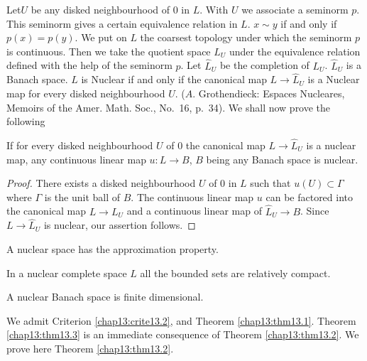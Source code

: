 \begin{crite}\label{chap13:crite13.2}
Let\pageoriginale $U$ be any disked neighbourhood of $0$ in $L$. With $U$ we
associate a seminorm $p$. This seminorm gives a certain equivalence
relation in $L$. $x \sim y$ if and only if $p(x) = p(y)$. We put on
$L$ the coarsest topology under which the seminorm $p$ is
continuous. Then we take the quotient space $L_U$ under the
equivalence relation defined with the help of the seminorm $p$. Let
$\hat{L}_U$ be the completion of $L_U$. $\hat{L}_U$ is a Banach
space. $L$ is Nuclear if and only if the canonical map $L \to
\hat{L}_U$ is a Nuclear map for every disked neighbourhood $U.$ ($A$.
Grothendieck: Espaces Nucleares, Memoirs of the Amer. Math. Soc.,
No.~16, p.~34). We shall now prove the following
\end{crite}

\begin{prop}\label{chap13:prop13.3}
If for every disked neighbourhood $U$ of $0$ the canonical map $L \to
\hat{L}_U$ is a nuclear map, any continuous linear map $u : L \to B$,
$B$ being any Banach space is nuclear.
\end{prop}

\begin{proof}
There exists a disked neighbourhood $U$ of $0$ in $L$ such that\break
$u(U)\subset \Gamma$ where $\Gamma$ is the unit ball of $B$. The
continuous linear map $u$ can be factored into the canonical map $L
\to L_U$ and a continuous linear map of $\hat{L}_U \to B$. Since $L
\to \hat{L}_U$ is nuclear, our assertion follows.
\end{proof}

\setcounter{section}{13}
\setcounter{theorem}{0}
\begin{theorem}\label{chap13:thm13.1}
A nuclear space has the approximation property.
\end{theorem}

\begin{theorem}\label{chap13:thm13.2}
In a nuclear complete space $L$ all the bounded sets are relatively compact.
\end{theorem}

\begin{theorem}\label{chap13:thm13.3}
A nuclear Banach space is finite dimensional. 
\end{theorem}
\noindent We admit Criterion \ref{chap13:crite13.2}, and Theorem
\ref{chap13:thm13.1}. Theorem \ref{chap13:thm13.3} is an
immediate consequence of Theorem \ref{chap13:thm13.2}. We prove here
Theorem \ref{chap13:thm13.2}.

